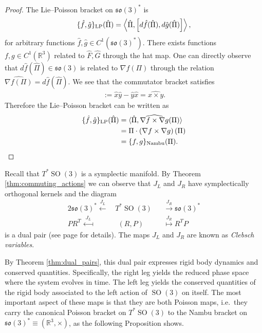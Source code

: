 \documentclass[12pt]{amsart}
\newcommand{\so}{\ensuremath{\mathfrak{so}}}
\DeclareMathOperator{\SO}{SO}
\begin{document}
  \begin{proof}
    The Lie--Poisson bracket on $\so(3)^*$ is
    \begin{align*}
      \{ \hat{f} , \hat{g} \}_{\rm LP} (\hat{\Pi}) =
      \left \langle \hat{\Pi} , \left[ d\hat{f}(\hat{\Pi}) , d\hat{g}(\hat{\Pi}) \right]
        \right \rangle,
    \end{align*}
    for arbitrary functions $\hat{f},\hat{g} \in C^1(\so(3)^*)$.
    There exists functions $f,g \in C^1(\mathbb{R}^3)$ related to $\hat{F},\hat{G}$ through the hat map.
    One can directly observe that $d\hat{f}(\hat{\Pi}) \in \so(3)$ is 
    related to $\nabla f(\Pi)$ through the relation $\widehat{ \nabla f(\Pi)} = d\hat{f}( \hat{\Pi})$.
    We see that the commutator bracket satisfies
    \begin{align*}
      [\hat{x},\hat{y} ] := \hat{x} \hat{y} - \hat{y} \hat{x} = \widehat{x \times y }.
    \end{align*}
    Therefore the Lie--Poisson bracket can be written as
    \begin{align*}
    \{ \hat{f} , \hat{g} \}_{\rm LP}(\hat{\Pi})
    &= \langle \hat{\Pi} , \widehat{ \nabla f \times \nabla g }(\Pi) \rangle \\
    &= \Pi \cdot  \left( \nabla f \times \nabla g \right)(\Pi) \\
    &= \{ f , g \}_{\rm Nambu}(\Pi).
    \end{align*}
  \end{proof}

  Recall that $T^*\SO(3)$ is a symplectic manifold.
  By Theorem \ref{thm:commuting_actions}
  we can observe that $J_L$ and $J_R$ have symplectically
  orthogonal kernels and the diagram
  \begin{alignat*}{2}
    \so(3)^* \stackrel{J_L}{\longleftarrow}&
    \,T^* \SO(3)
    &&\stackrel{J_R}{\longrightarrow} \so(3)^* \\
     PR^T \stackrel{J_L}{\longmapsfrom}&
    \;\; (R,P)
    &&\stackrel{J_R}{\longmapsto} R^TP
  \end{alignat*}
  is a dual pair
  (see page \pageref{thm:dual_pairs} for details).
  The maps $J_L$ and $J_R$ are known as \emph{Clebsch variables}. 

  By Theorem \ref{thm:dual_pairs}, this dual pair expresses rigid
  body dynamics and conserved quantities.
  Specifically, the right leg yields the reduced phase space where 
  the system evolves in time.
  The left leg yields the conserved quantities of the rigid body
  associated to the left action of $\SO(3)$ on itself.
  The most important aspect of these maps is that they are both Poisson
  maps, i.e.\ they carry the canonical Poisson bracket on $T^* \SO(3)$
  to the Nambu bracket on $\so(3)^* \equiv (\mathbb{R}^3,\times)$,
  as the following Proposition shows.
\end{document}

